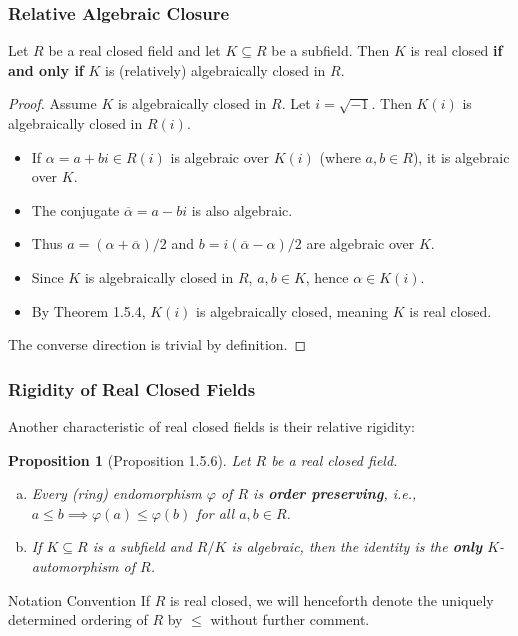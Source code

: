 \documentclass[11pt]{beamer}
\newtheorem{proposition}{Proposition}
\begin{document}
\begin{frame}
    \frametitle{Relative Algebraic Closure}
    
    \begin{corollary}[Corollary 1.5.5]
        Let $R$ be a real closed field and let $K \subseteq R$ be a subfield. Then $K$ is real closed \textbf{if and only if} $K$ is (relatively) algebraically closed in $R$.
    \end{corollary}

    \vspace{0.4em}
    \begin{proof}
        Assume $K$ is algebraically closed in $R$. Let $i = \sqrt{-1}$. Then $K(i)$ is algebraically closed in $R(i)$.
        \begin{itemize}
            \item If $\alpha = a + bi \in R(i)$ is algebraic over $K(i)$ (where $a, b \in R$), it is algebraic over $K$. 
            \item The conjugate $\overline{\alpha} = a - bi$ is also algebraic.
            \item Thus $a = (\alpha + \overline{\alpha})/2$ and $b = i(\overline{\alpha} - \alpha)/2$ are algebraic over $K$.
            \item Since $K$ is algebraically closed in $R$, $a, b \in K$, hence $\alpha \in K(i)$.
            \item By Theorem 1.5.4, $K(i)$ is algebraically closed, meaning $K$ is real closed.
        \end{itemize}
        The converse direction is trivial by definition. \qedhere
    \end{proof}
\end{frame}

\begin{frame}
    \frametitle{Rigidity of Real Closed Fields}
    
    Another characteristic of real closed fields is their relative rigidity:
    
    \vspace{0.4em}
    \begin{proposition}[Proposition 1.5.6]
        Let $R$ be a real closed field.
        \begin{enumerate}[(a)]
            \item Every (ring) endomorphism $\varphi$ of $R$ is \textbf{order preserving}, i.e., $a \leq b \implies \varphi(a) \leq \varphi(b)$ for all $a, b \in R$.
            \item If $K \subseteq R$ is a subfield and $R/K$ is algebraic, then the identity is the \textbf{only} $K$-automorphism of $R$.
        \end{enumerate}
    \end{proposition}

    \vspace{0.6em}
    \begin{alertblock}{Notation Convention}
        If $R$ is real closed, we will henceforth denote the uniquely determined ordering of $R$ by $\leq$ without further comment.
    \end{alertblock}
\end{frame}
\end{document}
